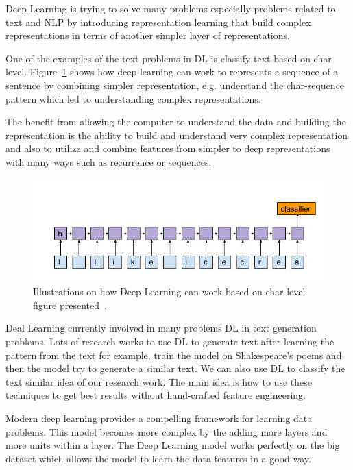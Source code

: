 {\color{red}
Deep Learning is trying to solve many problems especially problems related to text and NLP by introducing representation learning that build complex representations in terms of another simpler layer of representations. 

One of the examples of the text problems in DL is classify text based on char-level. Figure~\ref{Fig:Deep_Learning_Char_Level_Example} shows how deep learning can work to represents a sequence of a sentence by combining simpler representation, e.g. understand the char-sequence pattern which led to understanding complex representations. 

The benefit from allowing the computer to understand the data and building the representation is the ability to build and understand very complex representation and also to utilize and combine features from simpler to deep representations with many ways such as recurrence or sequences.

\begin{figure}[!ht] \includegraphics[width=.7\linewidth]{./Figures/Ch_2_Background/char-lstm.jpg}
	\caption{Illustrations on how Deep Learning can work based on char level figure presented~\cite{Stathis}.}
	\label{Fig:Deep_Learning_Char_Level_Example}
\end{figure}


Deal Learning currently involved in many problems  DL in text generation problems. Lots of research works to use DL to generate text after learning the pattern from the text for example, train the model on Shakespeare’s poems and then the model try to generate a similar text. We can also use DL to classify the text similar idea of our research work. The main idea is how to use these techniques to get best results without hand-crafted feature engineering.

}

Modern deep learning provides a compelling framework for learning data problems. This model becomes more complex by the adding more layers and more units within a layer. The Deep Learning model works perfectly on the big dataset which allows the model to learn the data features in a good way.

